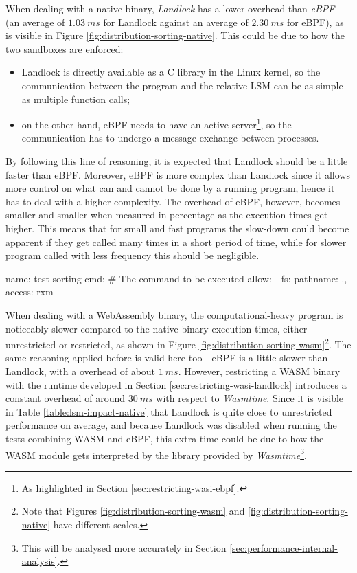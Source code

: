 When dealing with a native binary, \textit{Landlock} has a lower overhead than \textit{eBPF} (an average
of $1.03\ ms$ for Landlock against an average of $2.30\ ms$ for eBPF), as is visible in Figure \ref{fig:distribution-sorting-native}.
This could be due to how the two sandboxes are enforced:
\begin{itemize}
  \item Landlock is directly available as a C library in the Linux kernel, so the communication between
        the program and the relative LSM can be as simple as multiple function calls;
  \item on the other hand, eBPF needs to have an active server\footnote{As highlighted in Section \ref{sec:restricting-wasi-ebpf}.},
        so the communication has to undergo a message exchange between processes.
\end{itemize}
By following this line of reasoning, it is expected that Landlock should be a little faster than eBPF.
Moreover, eBPF is more complex than Landlock since it allows more control on what
can and cannot be done by a running program, hence it has to deal with a higher complexity.
The overhead of eBPF, however, becomes smaller and smaller when measured in percentage as the execution times get higher.
This means that for small and fast programs the slow-down could become apparent if they get called many times
in a short period of time, while for slower program called with less frequency this should be negligible.

\vspace*{0.5cm}
\begin{code}[language=yaml, caption=The outline of the policy used for testing the sorting program., label=lst:outline-policy-sorting-test]
name: test-sorting
cmd: # The command to be executed
allow:
- fs: {pathname: ., access: rxm}
\end{code}

When dealing with a WebAssembly binary, the computational-heavy program is noticeably slower
compared to the native binary execution times, either unrestricted or restricted, as shown in Figure
\ref{fig:distribution-sorting-wasm}\footnote{Note that Figures \ref{fig:distribution-sorting-wasm} and \ref{fig:distribution-sorting-native}
have different scales.}.
The same reasoning applied before is valid here too - eBPF is a little slower than Landlock, with a overhead
of about $1\ ms$.
However, restricting a WASM binary with the runtime developed in Section \ref{sec:restricting-wasi-landlock}
introduces a constant overhead of around $30\ ms$ with respect to \textit{Wasmtime}.
Since it is visible in Table \ref{table:lsm-impact-native} that Landlock is quite close to
unrestricted performance on average, and because Landlock was disabled when running
the tests combining WASM and eBPF, this extra time could be due to how the WASM module gets
interpreted by the library provided by \textit{Wasmtime}\footnote{This will be analysed more
accurately in Section \ref{sec:performance-internal-analysis}.}.

